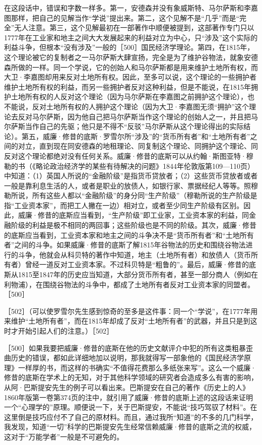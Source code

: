 在这段话中，错误和字数一样多。第一，安德森并没有象威斯特、马尔萨斯和李嘉图那样，把自己的见解当作“学说”提出来。第二，这个见解不是“几乎”而是“完全”无人注意。第三，这个见解最初在一部著作中顺便被提到，这部著作专门只以1777年在工业家和地主之间大大发展起来的利益对立为中心，只“涉及”这个实际的利益斗争，但根本“没有涉及”一般的［500］国民经济学理论。第四，在1815年，这个理论被它的复制者之一马尔萨斯大肆宣扬，完全是为了维护谷物法，就象安德森所做的一样。同一个学说，它的创始人和马尔萨斯都是用来维护土地所有权，而大卫·李嘉图却用来反对土地所有权。因此，至多可以说，这个理论的一些拥护者维护土地所有权的利益，而另一些拥护者反对这种利益，但是不能说，在1815年拥护土地所有权的人反对这个理论（因为马尔萨斯在李嘉图之前拥护这个理论），也不能说，反对土地所有权的人拥护这个理论（因为大卫·李嘉图无须“拥护”这个理论去反对马尔萨斯，因为他自己把马尔萨斯当作这个理论的创始人之一，并且把马尔萨斯当作自己的先驱；他只是不得不“反驳”马尔萨斯从这个理论得出的实际结论）。第五，威廉·修昔的底斯·罗雪尔所“涉及”的“货币所有者”和“土地所有者”之间的对立，直到现在同安德森的地租理论、同复制这个理论、同拥护这个理论、同反对这个理论都绝对没有任何关系。威廉·修昔的底斯可以从约翰·斯图亚特·穆勒的书（《略论政治经济学的某些有待解决的问题》1844年伦敦版第109—110页）中知道：（1）英国人所说的“金融阶级”是指货币贷放者；（2）这些货币贷放者或者一般是靠利息生活的人，或者是职业的放债人，如银行家、票据经纪人等等。照穆勒所说，所有这些人都以“金融阶级”的身分同“生产阶级”（穆勒所说的生产阶级是指“工业资本家”，而把工人撇在一边）相对立，或者至少同生产阶级有区别。因此，威廉·修昔的底斯应当看到，“生产阶级”即工业家，工业资本家的利益，同金融阶级的利益是极不相同的两回事；这些阶级也是不同的阶级。其次，威廉·修昔的底斯应当看到，工业资本家和地主之间的斗争决不是“货币所有者”和“土地所有者”之间的斗争。如果威廉·修昔的底斯了解1815年谷物法的历史和围绕谷物法进行的斗争，他就会从科贝特的著作中知道，地主（土地所有者）和放债人（货币所有者）曾经一道反对工业资本家。不过科贝特是“粗鲁的”。最后，威廉·修昔的底斯从1815至1847年的历史应当知道，大部分货币所有者，甚至一部分商人（例如在利物浦），在围绕谷物法的斗争中，都成了土地所有者反对工业资本家的同盟者。［500］

［502］（可以使罗雪尔先生感到惊奇的至多是这件事：同一个“学说”，在1777年用来维护“土地所有者”，而在1815年却成了反对“土地所有者”的武器，并且只是到这时才开始引起人们的注意。）［502］

［500］如果我要把威廉·修昔的底斯在他的历史文献评介中犯的所有这类粗暴歪曲历史的错误，都如此详细地加以说明，那我就得写一部象他的《国民经济学原理》一样厚的书，而这样的书确实“不值得花费那么多纸张来写”。这么一个威廉·修昔的底斯在学术上的无知，对于其他科学领域的研究者会造成多么有害的影响，从阿·巴斯提安先生的例子可以看出来。巴斯提安在自己的著作《历史上的人》1860年版第一卷第374页的注中，就引用了威廉·修昔的底斯上述的这段话来证明一个“心理学的”原理。顺便说一下，关于巴斯提安，不能说“技巧驾驭了材料”。在这里倒是技巧应付不了自己的原材料。而且，通过我所“知道”的不多的几门科学，我发现，知道“一切”科学的巴斯提安先生经常信赖威廉·修昔的底斯之流的权威，这对于“万能学者”一般是不可避免的。

